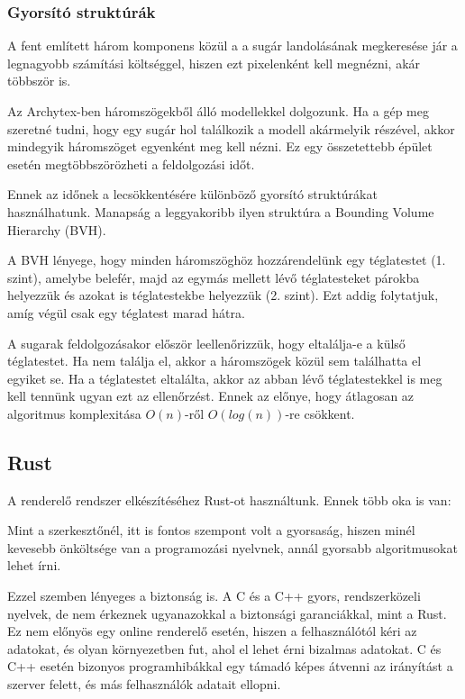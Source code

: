 \subsubsection{Gyorsító struktúrák}

A fent említett három komponens közül a a sugár landolásának megkeresése jár a legnagyobb számítási költséggel, hiszen ezt pixelenként kell megnézni, akár többször is.

Az Archytex-ben háromszögekből álló modellekkel dolgozunk. Ha a gép meg szeretné tudni, hogy egy sugár hol találkozik a modell akármelyik részével, akkor mindegyik háromszöget egyenként meg kell nézni. Ez egy összetettebb épület esetén megtöbbszörözheti a feldolgozási időt.

Ennek az időnek a lecsökkentésére különböző gyorsító struktúrákat használhatunk. Manapság a leggyakoribb ilyen struktúra a Bounding Volume Hierarchy (BVH).

A BVH lényege, hogy minden háromszöghöz hozzárendelünk egy téglatestet (1. szint), amelybe belefér, majd az egymás mellett lévő téglatesteket párokba helyezzük és azokat is téglatestekbe helyezzük (2. szint). Ezt addig folytatjuk, amíg végül csak egy téglatest marad hátra.

A sugarak feldolgozásakor először leellenőrizzük, hogy eltalálja-e a külső téglatestet. Ha nem találja el, akkor a háromszögek közül sem találhatta el egyiket se. Ha a téglatestet eltalálta, akkor az abban lévő téglatestekkel is meg kell tennünk ugyan ezt az ellenőrzést. Ennek az előnye, hogy átlagosan az algoritmus komplexitása $O(n)$-ről $O(log(n))$-re csökkent.

\subsection{Rust}
A renderelő rendszer elkészítéséhez Rust-ot használtunk. Ennek több oka is van:

Mint a szerkesztőnél, itt is fontos szempont volt a gyorsaság, hiszen minél kevesebb önköltsége van a programozási nyelvnek, annál gyorsabb algoritmusokat lehet írni.

Ezzel szemben lényeges a biztonság is. A C és a C++ gyors, rendszerközeli nyelvek, de nem érkeznek ugyanazokkal a biztonsági garanciákkal, mint a Rust. Ez nem előnyös egy online renderelő esetén, hiszen a felhasználótól kéri az adatokat, és olyan környezetben fut, ahol el lehet érni bizalmas adatokat. C és C++ esetén bizonyos programhibákkal egy támadó képes átvenni az irányítást a szerver felett, és más felhasználók adatait ellopni.

